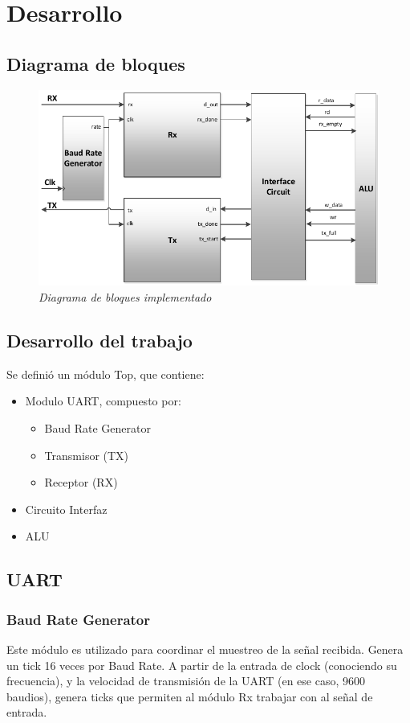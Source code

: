 \documentclass[12pt,A4paper,titlepage]{article}
\begin{document}
\section{Desarrollo}
\subsection{Diagrama de bloques}
\begin{figure}[H] 
	\centering
	\includegraphics[scale=0.6]{figure/diagrama-UART.png}
	\caption{\textit{Diagrama de bloques implementado}}
\end{figure}

\subsection{Desarrollo del trabajo}
Se definió un módulo Top, que contiene:
\begin{itemize}
    \item Modulo UART, compuesto por:
    \begin{itemize}
        \item Baud Rate Generator
        \item Transmisor (TX)
        \item Receptor (RX)
    \end{itemize}
    \item Circuito Interfaz
    \item ALU
\end{itemize}

\subsection{UART}
\subsubsection{Baud Rate Generator}Este módulo es utilizado para coordinar el muestreo de la señal recibida. Genera un tick 16 veces por Baud Rate. A partir de la entrada de clock (conociendo su frecuencia), y la velocidad de transmisión de la UART (en ese caso, 9600 baudios), genera ticks que permiten al módulo Rx trabajar con al señal de entrada.
\end{document}
